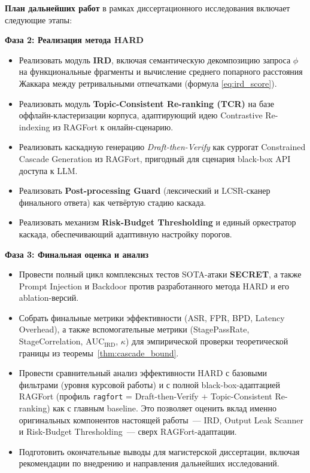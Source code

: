 \documentclass[12pt, a4paper]{article}
\theoremstyle{definition}
\theoremstyle{remark}
\begin{document}
\textbf{План дальнейших работ} в рамках диссертационного исследования включает следующие этапы:

\textbf{Фаза 2: Реализация метода HARD}
\begin{itemize}[label=$\circ$]
    \item Реализовать модуль \textbf{IRD}, включая семантическую декомпозицию запроса $\phi$ на функциональные фрагменты и вычисление среднего попарного расстояния Жаккара между ретривальными отпечатками (формула \eqref{eq:ird_score}).
    \item Реализовать модуль \textbf{Topic-Consistent Re-ranking (TCR)} на базе оффлайн-кластеризации корпуса, адаптирующий идею Contrastive Re-indexing из RAGFort к онлайн-сценарию.
    \item Реализовать каскадную генерацию \textit{Draft-then-Verify} как суррогат Constrained Cascade Generation из RAGFort, пригодный для сценария black-box API доступа к LLM.
    \item Реализовать \textbf{Post-processing Guard} (лексический и $\mathrm{LCSR}$-сканер финального ответа) как четвёртую стадию каскада.
    \item Реализовать механизм \textbf{Risk-Budget Thresholding} и единый оркестратор каскада, обеспечивающий адаптивную настройку порогов.
\end{itemize}

\textbf{Фаза 3: Финальная оценка и анализ}
\begin{itemize}[label=$\circ$]
    \item Провести полный цикл комплексных тестов SOTA-атаки \textbf{SECRET}, а также Prompt Injection и Backdoor против разработанного метода HARD и его ablation-версий.
    \item Собрать финальные метрики эффективности (ASR, FPR, BPD, Latency Overhead), а также вспомогательные метрики (StagePassRate, StageCorrelation, $\mathrm{AUC}_{\text{IRD}}$, $\kappa$) для эмпирической проверки теоретической границы из теоремы~\ref{thm:cascade_bound}.
    \item Провести сравнительный анализ эффективности HARD с базовыми фильтрами (уровня курсовой работы) и с полной black-box-адаптацией RAGFort (профиль \texttt{ragfort} = Draft-then-Verify $+$ Topic-Consistent Re-ranking) как с главным baseline. Это позволяет оценить вклад именно оригинальных компонентов настоящей работы~--- IRD, Output Leak Scanner и Risk-Budget Thresholding~--- сверх RAGFort-адаптации.
    \item Подготовить окончательные выводы для магистерской диссертации, включая рекомендации по внедрению и направления дальнейших исследований.
\end{itemize}
\end{document}
